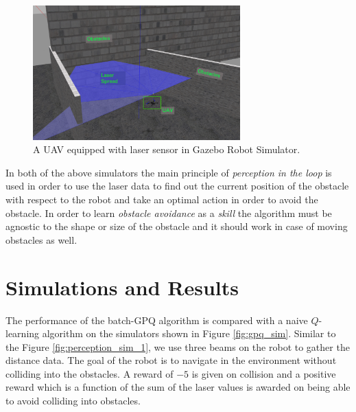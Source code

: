 \documentclass[12pt]{report}
\begin{document}
\begin{itemize}
\begin{figure}[htp]
	\centering
	\includegraphics[width=8cm]{perception_sim_2.png}
	\caption {A UAV equipped with laser sensor in Gazebo Robot Simulator.}
   \label{fig:perception_sim_2}
\end{figure}
\end{itemize}

In both of the above simulators the main principle of \textit{perception in the loop} is used in order to use the laser data to find out the current position of the obstacle with respect to the robot and take an optimal action in order to avoid the obstacle. In order to learn \textit{obstacle avoidance} as a \textit{skill} the algorithm must be agnostic to the shape or size of the obstacle and it should work in case of moving obstacles as well.


\section{Simulations and Results}


The performance of the batch-GPQ algorithm is compared with a naive $Q$-learning algorithm on the simulators shown in Figure \ref{fig:gpq_sim}. Similar to the Figure \ref{fig:perception_sim_1}, we use three beams on the robot to gather the distance data. The goal of the robot is to navigate in the environment without colliding into the obstacles. A reward of $-5$ is given on collision and a positive reward which is a function of the sum of the laser values is awarded on being able to avoid colliding into obstacles. 
\end{document}
